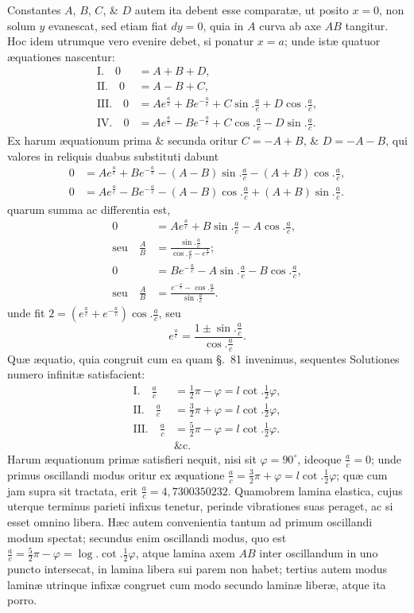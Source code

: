 Constantes $A$, $B$, $C$, \& $D$ autem ita debent esse comparatæ, ut posito $x=0$, non solum $y$ evanescat, sed etiam fiat $dy=0$, quia in $A$ curva ab axe $AB$ tangitur. Hoc idem utrumque vero evenire debet, si ponatur $x=a$; unde istæ quatuor æquationes nascentur:
\[\begin{aligned}
\mathrm I.\quad0&=A+B+D,\\
\mathrm {II}.\quad0&=A-B+C,\\
\mathrm {III}.\quad0&=Ae^{\frac ac}+Be^{-\frac ac}+C\sin.\frac ac+D\cos.\frac ac,\\
\mathrm {IV}.\quad0&=Ae^{\frac ac}-Be^{-\frac ac}+C\cos.\frac ac-D\sin.\frac ac.
\end{aligned}\]
Ex harum æquationum prima \& secunda oritur $C=-A+B$, \& $D=-A-B$, qui valores in reliquis duabus substituti dabunt
\[\begin{aligned}
0&=Ae^{\frac ac}+Be^{-\frac ac}-(A-B)\sin.\frac ac-(A+B)\cos.\frac ac,\\
0&=Ae^{\frac ac}-Be^{-\frac ac}-(A-B)\cos.\frac ac+(A+B)\sin.\frac ac.
\end{aligned}\]
quarum summa ac differentia est,
\[\begin{aligned}
0&=Ae^{\frac ac}+B\sin.\frac ac-A\cos.\frac ac,\\
\text{seu}\quad\frac AB&=\frac{\sin.\frac ac}{\cos.\frac ac-e^{\frac ac}};\\
0&=Be^{-\frac ac}-A\sin.\frac ac-B\cos.\frac ac,\\
\text{seu}\quad\frac AB&=\frac{e^{-\frac ac}-\cos.\frac ac}{\sin.\frac ac}.
\end{aligned}\]
unde fit $2=(e^{\frac ac}+e^{-\frac ac})\cos.\frac ac$, seu
\[e^{\frac ac}=\frac{1\pm\sin.\frac ac}{\cos.\frac ac}.\]
Quæ æquatio, quia congruit cum ea quam §.~81 invenimus, sequentes Solutiones numero infinitæ satisfacient:
\[\begin{aligned}
\mathrm I.\quad\frac ac&=\tfrac12\pi-\varphi=l\cot.\tfrac12\varphi,\\
\mathrm {II}.\quad\frac ac&=\tfrac32\pi+\varphi=l\cot.\tfrac12\varphi,\\
\mathrm {III}.\quad\frac ac&=\tfrac52\pi-\varphi=l\cot.\tfrac12\varphi.\\
&\text{\&c.}
\end{aligned}\]
Harum æquationum primæ satisfieri nequit, nisi sit $\varphi=90^\circ$, ideoque $\frac ac=0$; unde primus oscillandi modus oritur ex æquatione $\frac ac=\frac32\pi+\varphi=l\cot.\frac12\varphi$; quæ cum jam supra sit tractata, erit $\frac ac=4{,}7300350232$. Quamobrem lamina elastica, cujus uterque terminus parieti infixus tenetur, perinde vibrationes suas peraget, ac si esset omnino libera. Hæc
autem convenientia tantum ad primum oscillandi modum spectat; secundus enim oscillandi modus, quo est $\frac ac=\frac52\pi-\varphi=\log.\cot.\frac12\varphi$, atque lamina axem $AB$ inter oscillandum in uno puncto intersecat, in lamina libera sui parem non habet; tertius autem modus laminæ utrinque infixæ congruet cum modo secundo laminæ liberæ, atque ita porro.

